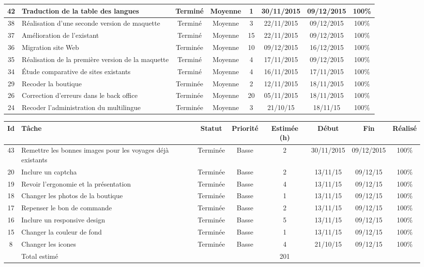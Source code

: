 \begin{tabular}{ | c | p{4cm} | c | c | c | c | c | c |  }
42 & Traduction de la table des langues & Terminé & Moyenne &  1 & 30/11/2015 &
09/12/2015 & 100\% \\ \hline
 38 & Réalisation d'une seconde version de maquette  & Terminé & Moyenne &  3 &
 22/11/2015 & 09/12/2015 & 100\% \\ \hline 
 37 & Amélioration de l'existant & Terminé & Moyenne &  15 & 22/11/2015 &
 09/12/2015 & 100\% \\ \hline 
 36 & Migration site Web & Terminée & Moyenne &  10 & 09/12/2015 & 16/12/2015
 & 100\% \\ \hline
  35 & Réalisation de la première version de la maquette & Terminé & Moyenne & 
  4 & 17/11/2015 & 09/12/2015 & 100\% \\ \hline 
  34 & Étude comparative de sites existants & Terminé & Moyenne &  4 &
  16/11/2015 & 17/11/2015 & 100\% \\ 
  \hline 29 & Recoder la boutique & Terminée & Moyenne & 2
	& 12/11/2015 & 18/11/2015 & 100\%  \\ \hline
26 & Correction d'erreurs dans le back office & Terminée &
Moyenne & 20 & 05/11/2015 & 18/11/2015 & 100\%  \\ \hline
24 & Recoder l'administration du
	multilingue & Terminée & Moyenne & 3 & 21/10/15 & 18/11/15 & 100\%  \\ 
\hline
	
	 \end{tabular}
	 \newpage
	\begin{tabular}{ | c | p{4cm} | c | c | c | c | c | c |  }
\hline 
Id & Tâche & Statut & Priorité & Estimée (h) & Début & Fin & Réalisé \\ \hline
43 &  Remettre les bonnes images pour les voyages déjà
existants & Terminée & Basse & 2 & 30/11/2015 & 09/12/2015 & 100\% \\ \hline
 20 & Inclure un captcha & Terminée & Basse & 2 & 13/11/15 &
	09/12/15 & 100\%  \\ \hline
19 & Revoir l'ergonomie et la présentation & Terminée & Basse & 4 & 13/11/15
	& 09/12/15 & 100\% \\ \hline
18 & Changer les photos de la boutique & Terminée & Basse & 1 & 13/11/15 &
	09/12/15 & 100\%  \\ \hline
17 & Repenser le bon de commande & Terminée & Basse & 2 & 13/11/15 & 09/12/15
	&  100\% \\ \hline
16 & Inclure un responsive design & Terminée & Basse & 5 &
	13/11/15 & 09/12/15 & 100\% \\ \hline
15 & Changer la couleur de fond & Terminée & Basse & 1 & 13/11/15 & 09/12/15
	& 100\%  \\ \hline
8 & Changer les icones & Terminée & Basse & 4 & 21/10/15 & 09/12/15 & 100\% \\
\hline

 & Total estimé &  &  & 201 &  &  & \\ \hline
 \end{tabular}